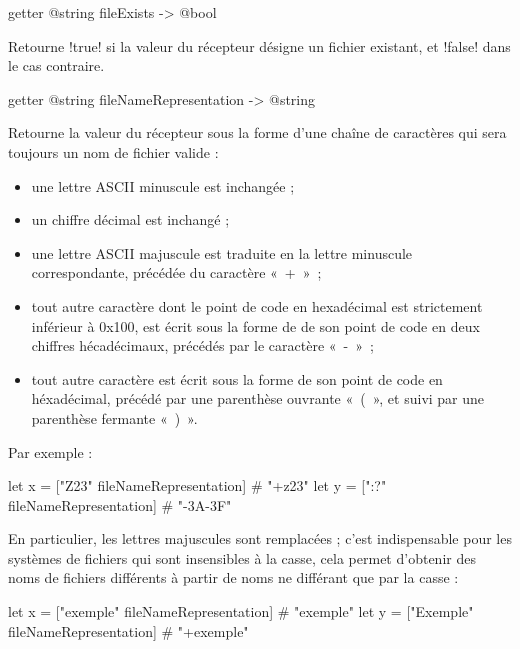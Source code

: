 \begin{galgas3box}
getter @string fileExists -> @bool
\end{galgas3box}

Retourne \ggst!true! si la valeur du récepteur désigne un fichier existant, et \ggst!false! dans le cas contraire.







\begin{galgas3box}
getter @string fileNameRepresentation -> @string
\end{galgas3box}

Retourne la valeur du récepteur sous la forme d'une chaîne de caractères qui sera toujours un nom de fichier valide :
\begin{itemize}
\item une lettre ASCII minuscule est inchangée ;
\item un chiffre décimal est inchangé ;
\item une lettre ASCII majuscule est traduite en la lettre minuscule correspondante, précédée du caractère «~+~»~;
\item tout autre caractère dont le point de code en hexadécimal est strictement inférieur à 0x100, est écrit sous la forme de de son point de code en deux chiffres hécadécimaux, précédés par le caractère «~-~»~;
\item tout autre caractère est écrit sous la forme de son point de code en héxadécimal, précédé par une parenthèse ouvrante «~(~», et suivi par une parenthèse fermante «~)~».
\end{itemize}

Par exemple :
\begin{galgas3}
let x = ["Z23" fileNameRepresentation] # "+z23"
let y = [":?" fileNameRepresentation] # "-3A-3F"
\end{galgas3}

En particulier, les lettres majuscules sont remplacées ; c'est indispensable pour les systèmes de fichiers qui sont insensibles à la casse, cela permet d'obtenir des noms de fichiers différents à partir de noms ne différant que par la casse :

\begin{galgas3}
let x = ["exemple" fileNameRepresentation] # "exemple"
let y = ["Exemple" fileNameRepresentation] # "+exemple"
\end{galgas3}






